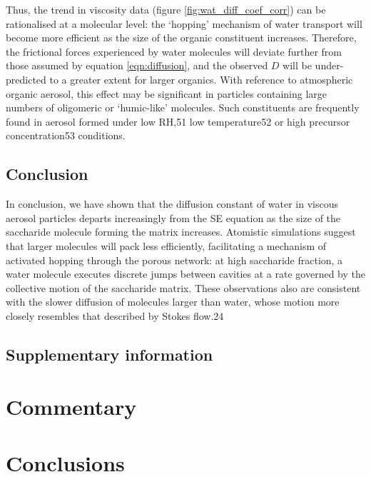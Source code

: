 Thus, the trend in viscosity data (figure \ref{fig:wat_diff_coef_corr}) can be rationalised at a molecular level: the `hopping’ mechanism of water transport will become more efficient as the size of the organic constituent increases. Therefore, the frictional forces experienced by water molecules will deviate further from those assumed by equation \ref{eqn:diffusion}, and the observed $D$ will be under-predicted to a greater extent for larger organics. With reference to atmospheric organic aerosol, this effect may be significant in particles containing large numbers of oligomeric or ‘humic-like’ molecules. Such constituents are frequently found in aerosol formed under low RH,51 low temperature52 or high precursor concentration53 conditions.

\subsection{Conclusion}
In conclusion, we have shown that the diffusion constant of water in viscous aerosol particles departs increasingly from the SE equation as the size of the saccharide molecule forming the matrix increases. Atomistic simulations suggest that larger molecules will pack less efficiently, facilitating a mechanism of activated hopping through the porous network: at high saccharide fraction, a water molecule executes discrete jumps between cavities at a rate governed by the collective motion of the saccharide matrix. These observations also are consistent with the slower diffusion of molecules larger than water, whose motion more closely resembles that described by Stokes flow.24

\subsection{Supplementary information}

\section{Commentary}

\section{Conclusions}



